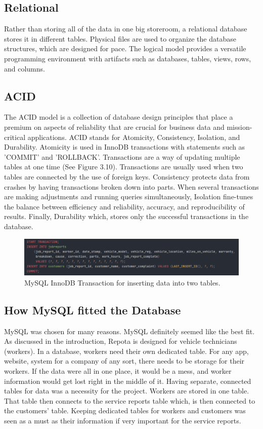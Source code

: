  \subsection{Relational}
 Rather than storing all of the data in one big storeroom, a relational database stores it in different tables. Physical files are used to organize the database structures, which are designed for pace. The logical model provides a versatile programming environment with artifacts such as databases, tables, views, rows, and columns. \cite{ref11}
 
 \subsection{ACID}
The ACID model is a collection of database design principles that place a premium on aspects of reliability that are crucial for business data and mission-critical applications. ACID stands for Atomicity, Consistency, Isolation, and Durability. Atomicity is used in InnoDB transactions with statements such as 'COMMIT' and 'ROLLBACK'. Transactions are a way of updating multiple tables at one time (See Figure 3.10). Transactions are usually used when two tables are connected by the use of foreign keys. Consistency protects data from crashes by having transactions broken down into parts. When several transactions are making adjustments and running queries simultaneously, Isolation fine-tunes the balance between efficiency and reliability, accuracy, and reproducibility of results. Finally, Durability which, stores only the successful transactions in the database. \cite{ref12}
 
 \begin{figure}[H]
    \caption{MySQL InnoDB Transaction for inserting data into two tables.}
    \label{image:transaction}
    \centering
    \includegraphics[width=1.0\textwidth]{images/misc/mysql-transation.png}
\end{figure}

\subsection{How MySQL fitted the Database}
MySQL was chosen for many reasons. MySQL definitely seemed like the best fit. As discussed in the introduction, Repota is designed for vehicle technicians (workers). In a database, workers need their own dedicated table. For any app, website, system for a company of any sort, there needs to be storage for their workers. If the data were all in one place, it would be a mess, and worker information would get lost right in the middle of it. Having separate, connected tables for data was a necessity for the project. Workers are stored in one table. That table then connects to the service reports table which, is then connected to the customers' table. Keeping dedicated tables for workers and customers was seen as a must as their information if very important for the service reports.

